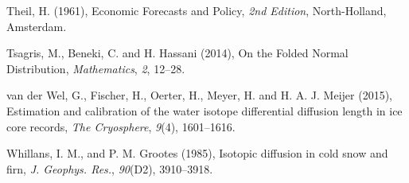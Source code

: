 \documentclass[draft, jgrga]{AGUTeX}
\begin{document}
\begin{article}
\begin{thebibliography}{}
Theil, H. (1961),
{Economic Forecasts and Policy},
\textit{2nd Edition}, North-Holland, Amsterdam.

Tsagris, M., Beneki, C. and H. Hassani (2014),
{On the Folded Normal Distribution},
\textit{Mathematics}, \textit{2}, 12--28.

van der Wel, G., Fischer, H., Oerter, H., Meyer, H. and H. A. J. Meijer (2015),
Estimation and calibration of the water isotope differential diffusion length in ice core records,
\textit{The Cryosphere}, \textit{9}(4), 1601--1616.

Whillans, I. M., and P. M. Grootes (1985),
Isotopic diffusion in cold snow and firn,
\textit{J. Geophys. Res.}, \textit{90}(D2), 3910--3918.


\end{thebibliography}





\end{article}

\end{document}
